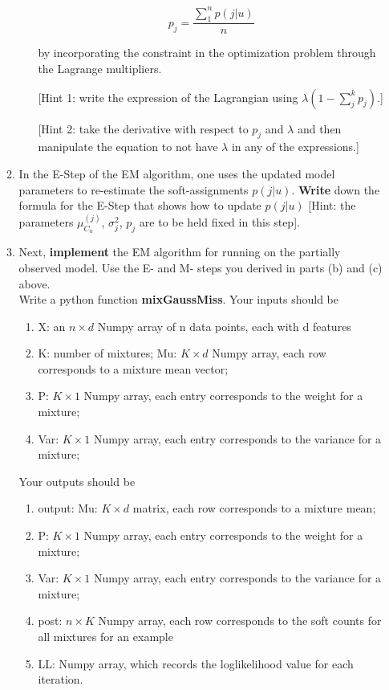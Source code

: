 \begin{enumerate}
\begin{enumerate}
\begin{enumerate}
$$ p_j = \frac{\sum^{n}_{1} p(j|u)}{n}$$

by incorporating the constraint in the optimization problem through the Lagrange multipliers.

[Hint 1: write the expression of the Lagrangian using $ \lambda (1 -\sum^{k}_{j} p_j) $.]

[Hint 2: take the derivative with respect to $p_j$ and $\lambda$ and then manipulate the equation to not have $\lambda$ in any of the expressions.]

\end{enumerate}

\item In the E-Step of the EM algorithm, one uses the updated model parameters to re-estimate  the soft-assignments $p(j|u)$. \textbf{Write} down the formula for the E-Step that shows how to update $p(j|u)$ [Hint: the parameters $\mu^{(j)}_{C_u}$, $\sigma^2_j$, $p_j$ are to be held fixed in this step].

\item Next, \textbf{implement} the EM algorithm for running on the partially observed model. Use the E- and M- steps you derived in parts (b) and (c) above.\\
    Write a python function \textbf{mixGaussMiss}. Your inputs should be
    \begin{enumerate}
    \item X: an $n \times d$ Numpy array of n data points, each with d features
    \item K: number of mixtures; Mu: $K \times d$ Numpy array, each row corresponds to a mixture mean vector;
    \item P: $K \times 1$ Numpy array, each entry corresponds to the weight for a mixture;
    \item Var: $K \times 1$ Numpy array, each entry corresponds to the variance for a mixture;
    \end{enumerate}
    Your outputs should be
    \begin{enumerate}
    \item output: Mu: $K \times d$ matrix, each row corresponds to a mixture mean;
    \item P: $K \times 1$ Numpy array, each entry corresponds to the weight for a mixture;
    \item Var: $K \times 1$ Numpy array, each entry corresponds to the variance for a mixture;
    \item post: $n \times K$ Numpy array, each row corresponds to the soft counts for all mixtures for an example
    \item LL: Numpy array, which records the loglikelihood value for each iteration.
    \end{enumerate}


\end{enumerate}
\end{enumerate}
